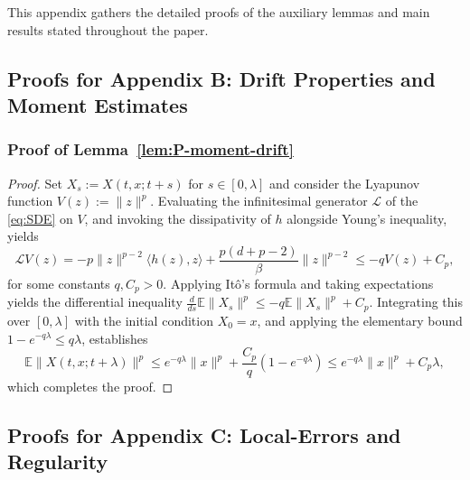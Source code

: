 \documentclass[11pt,a4paper,reqno]{amsart}
\theoremstyle{plain}
\theoremstyle{definition}
\theoremstyle{remark}
\newcommand{\E}{\mathbb{E}}
\begin{document}
This appendix gathers the detailed proofs of the auxiliary lemmas and main results stated throughout the paper.



\subsection{Proofs for Appendix B: Drift Properties and Moment Estimates}

\subsubsection{Proof of Lemma~\ref{lem:P-moment-drift}}
\label{proof:P-moment-drift-proof}
\begin{proof}
Set $X_s:=X(t,x;t+s)$ for $s\in[0,\lambda]$ and consider the Lyapunov function $V(z):=\|z\|^p$. Evaluating the infinitesimal generator $\mathcal L$ of the \ref{eq:SDE} on $V$, and invoking the dissipativity of $h$ alongside Young's inequality, yields
\[
  \mathcal L V(z) = -p\|z\|^{p-2}\langle h(z),z\rangle + \frac{p(d+p-2)}{\beta}\|z\|^{p-2} \le -qV(z)+C_p,
\]
for some constants $q,C_p>0$. Applying It\^o's formula and taking expectations yields the differential inequality $\frac{d}{ds}\E\|X_s\|^p \le -q\E\|X_s\|^p + C_p$. Integrating this over $[0,\lambda]$ with the initial condition $X_0 = x$, and applying the elementary bound $1-e^{-q\lambda}\le q\lambda$, establishes
\[
  \E\|X(t,x;t+\lambda)\|^p \le e^{-q\lambda}\|x\|^p+\frac{C_p}{q}(1-e^{-q\lambda}) \le e^{-q\lambda}\|x\|^p+C_p\lambda,
\]
which completes the proof.
\end{proof}




\subsection{Proofs for Appendix C: Local-Errors and Regularity}
\end{document}
